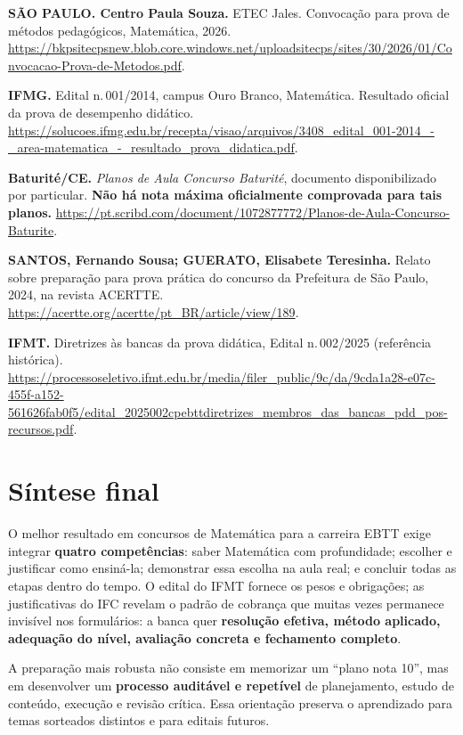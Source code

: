 \documentclass[11pt,a4paper]{article}
\begin{document}
\begin{enumerate}[label={[\arabic*]},leftmargin=2em]
\item \textbf{SÃO PAULO. Centro Paula Souza.} ETEC Jales. Convocação para prova de métodos pedagógicos, Matemática, 2026. \url{https://bkpsitecpsnew.blob.core.windows.net/uploadsitecps/sites/30/2026/01/Convocacao-Prova-de-Metodos.pdf}.
\item \textbf{IFMG.} Edital n.\,001/2014, campus Ouro Branco, Matemática. Resultado oficial da prova de desempenho didático. \url{https://solucoes.ifmg.edu.br/recepta/visao/arquivos/3408_edital_001-2014_-_area-matematica_-_resultado_prova_didatica.pdf}.
\item \textbf{Baturité/CE.} \textit{Planos de Aula Concurso Baturité}, documento disponibilizado por particular. \textbf{Não há nota máxima oficialmente comprovada para tais planos.} \url{https://pt.scribd.com/document/1072877772/Planos-de-Aula-Concurso-Baturite}.
\item \textbf{SANTOS, Fernando Sousa; GUERATO, Elisabete Teresinha.} Relato sobre preparação para prova prática do concurso da Prefeitura de São Paulo, 2024, na revista ACERTTE. \url{https://acertte.org/acertte/pt_BR/article/view/189}.
\item \textbf{IFMT.} Diretrizes às bancas da prova didática, Edital n.\,002/2025 (referência histórica). \url{https://processoseletivo.ifmt.edu.br/media/filer_public/9c/da/9cda1a28-e07c-455f-a152-561626fab0f5/edital_2025002cpebttdiretrizes_membros_das_bancas_pdd_pos-recursos.pdf}.
\end{enumerate}

\section*{Síntese final}
O melhor resultado em concursos de Matemática para a carreira EBTT exige integrar \textbf{quatro competências}: saber Matemática com profundidade; escolher e justificar como ensiná-la; demonstrar essa escolha na aula real; e concluir todas as etapas dentro do tempo. O edital do IFMT fornece os pesos e obrigações; as justificativas do IFC revelam o padrão de cobrança que muitas vezes permanece invisível nos formulários: a banca quer \textbf{resolução efetiva, método aplicado, adequação do nível, avaliação concreta e fechamento completo}.

A preparação mais robusta não consiste em memorizar um ``plano nota 10'', mas em desenvolver um \textbf{processo auditável e repetível} de planejamento, estudo de conteúdo, execução e revisão crítica. Essa orientação preserva o aprendizado para temas sorteados distintos e para editais futuros.
\end{document}
